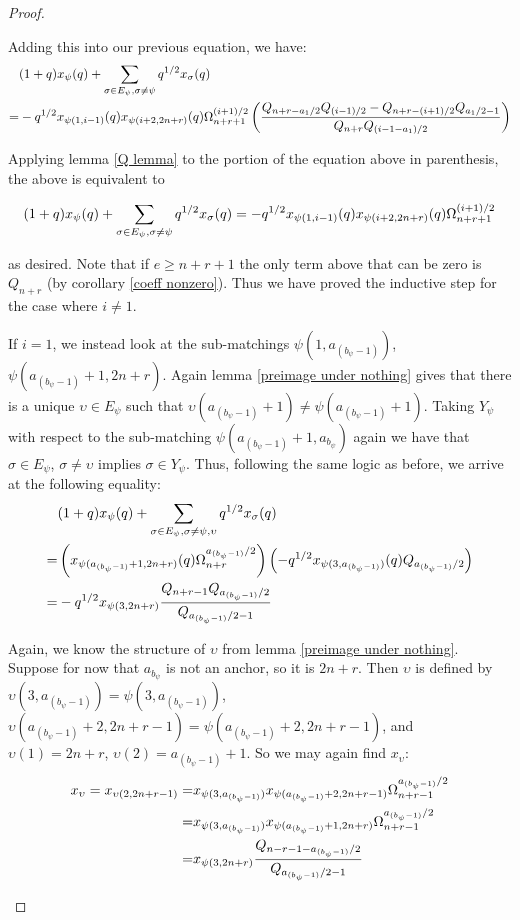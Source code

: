 \documentclass{amsart}
\begin{document}
\begin{proof}
\begin{enumerate}[label={\textit{Case \arabic*.}}]
 		Adding this into our previous equation, we have:
 		\begin{align*}
 			&(1+q)x_\psi(q)+\sum_{\sigma\in E_\psi,\sigma\not=\psi}q^{1/2}x_\sigma(q)\\
 			=&-q^{1/2}x_{\psi(1,i-1)}(q)x_{\psi(i+2,2n+r)}(q)\Omega_{n+r+1}^{(i+1)/2}\left( \frac{Q_{n+r-a_1/2}Q_{(i-1)/2}-Q_{n+r-(i+1)/2}Q_{a_1/2-1}}{Q_{n+r}Q_{(i-1-a_1)/2}} \right)
 		\end{align*}
 		
 		Applying lemma \ref{Q lemma} to the portion of the equation above in parenthesis, the above is equivalent to
 		
 		$$(1+q)x_\psi(q)+\sum_{\sigma\in E_\psi,\sigma\not=\psi}q^{1/2}x_\sigma(q)=-q^{1/2}x_{\psi(1,i-1)}(q)x_{\psi(i+2,2n+r)}(q)\Omega_{n+r+1}^{(i+1)/2}$$
 		
 		as desired. Note that if $e\geq n+r+1$ the only term above that can be zero is $Q_{n+r}$ (by corollary \ref{coeff nonzero}). Thus we have proved the inductive step for the case where $i\not=1$.
 		
 		\vspace{5mm}
 		If $i=1$, we instead look at the sub-matchings $\psi(1,a_{(b_\psi-1)})$, $\psi(a_{(b_\psi-1)}+1,2n+r)$. Again lemma \ref{preimage under nothing} gives that there is a unique $\upsilon\in E_\psi$ such that $\upsilon(a_{(b_\psi-1)}+1)\not=\psi(a_{(b_\psi-1)}+1)$. Taking $Y_\psi$ with respect to the sub-matching $\psi(a_{(b_\psi-1)}+1,a_{b_\psi})$ again we have that $\sigma\in E_\psi$, $\sigma\not=\upsilon$ implies $\sigma\in Y_\psi$. Thus, following the same logic as before, we arrive at the following equality:
 		\begin{align*}
 			&(1+q)x_\psi(q)+\sum_{\sigma\in E_\psi,\sigma\not=\psi,\upsilon}q^{1/2}x_\sigma(q)\\
 			=&\left( x_{\psi(a_{(b_\psi-1)}+1,2n+r)}(q)\Omega_{n+r}^{a_{(b_\psi-1)}/2} \right)\left( -q^{1/2}x_{\psi(3,a_{(b_\psi-1)})}(q)Q_{a_{(b_\psi-1)}/2} \right)\\
 			=&-q^{1/2}x_{\psi(3,2n+r)}\frac{Q_{n+r-1}Q_{a_{(b_\psi-1)}/2}}{Q_{a_{(b_\psi-1)}/2-1}}
 		\end{align*}
 		
 		Again, we know the structure of $\upsilon$ from lemma \ref{preimage under nothing}. Suppose for now that $a_{b_\psi}$ is not an anchor, so it is $2n+r$. Then $\upsilon$ is defined by $\upsilon(3,a_{(b_\psi-1)})=\psi(3,a_{(b_\psi-1)})$, $\upsilon(a_{(b_\psi-1)}+2,2n+r-1)=\psi(a_{(b_\psi-1)}+2,2n+r-1)$, and $\upsilon(1)=2n+r$, $\upsilon(2)=a_{(b_\psi-1)}+1$. So we may again find $x_\upsilon$:
 		\begin{align*}
 			x_\upsilon=x_{\upsilon(2,2n+r-1)}=&x_{\psi(3,a_{(b_\psi-1)})}x_{\psi(a_{(b_\psi-1)}+2,2n+r-1)}\Omega_{n+r-1}^{a_{(b_\psi-1)}/2}\\
 			=&x_{\psi(3,a_{(b_\psi-1)})}x_{\psi(a_{(b_\psi-1)}+1,2n+r)}\Omega_{n+r-1}^{a_{(b_\psi-1)}/2}\\
 			=&x_{\psi(3,2n+r)}\frac{Q_{n-r-1-a_{(b_\psi-1)}/2}}{Q_{a_{(b_\psi-1)}/2-1}}
 		\end{align*}
 		

\end{enumerate}
\end{proof}
\end{document}
